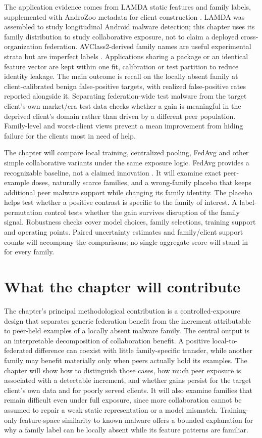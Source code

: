 \documentclass[11pt,a4paper]{article}
\begin{document}
The application evidence comes from LAMDA static features and family labels, supplemented with AndroZoo metadata for client construction \citep{allix2016,haque2026}. LAMDA was assembled to study longitudinal Android malware detection; this chapter uses its family distribution to study collaborative exposure, not to claim a deployed cross-organization federation. AVClass2-derived family names are useful experimental strata but are imperfect labels \citep{sebastian2020}. Applications sharing a package or an identical feature vector are kept within one fit, calibration or test partition to reduce identity leakage. The main outcome is recall on the locally absent family at client-calibrated benign false-positive targets, with realized false-positive rates reported alongside it. Separating federation-wide test malware from the target client's own market/era test data checks whether a gain is meaningful in the deprived client's domain rather than driven by a different peer population. Family-level and worst-client views prevent a mean improvement from hiding failure for the clients most in need of help.

The chapter will compare local training, centralized pooling, FedAvg and other simple collaborative variants under the same exposure logic. FedAvg provides a recognizable baseline, not a claimed innovation \citep{mcmahan2017}. It will examine exact peer-example doses, naturally scarce families, and a wrong-family placebo that keeps additional peer malware support while changing its family identity. The placebo helps test whether a positive contrast is specific to the family of interest. A label-permutation control tests whether the gain survives disruption of the family signal. Robustness checks cover model choices, family selections, training support and operating points. Paired uncertainty estimates and family/client support counts will accompany the comparisons; no single aggregate score will stand in for every family.

\section*{What the chapter will contribute}

The chapter's principal methodological contribution is a controlled-exposure design that separates generic federation benefit from the increment attributable to peer-held examples of a locally absent malware family. The central output is an interpretable decomposition of collaboration benefit. A positive local-to-federated difference can coexist with little family-specific transfer, while another family may benefit materially only when peers actually hold its examples. The chapter will show how to distinguish those cases, how much peer exposure is associated with a detectable increment, and whether gains persist for the target client's own data and for poorly served clients. It will also examine families that remain difficult even under full exposure, since more collaboration cannot be assumed to repair a weak static representation or a model mismatch. Training-only feature-space similarity to known malware offers a bounded explanation for why a family label can be locally absent while its feature patterns are familiar.
\end{document}
